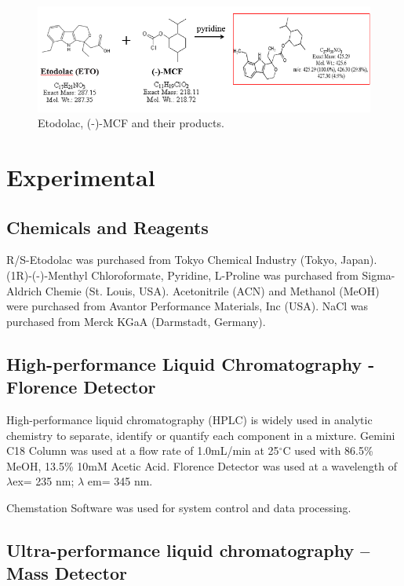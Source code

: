 \documentclass[12pt]{article} %
\begin{document}
\begin{figure}[h]
  \includegraphics[width=\linewidth]{fig1.png}
  \caption{Etodolac, (-)-MCF and their products.}
  \label{fig:fig1}
\end{figure}

\newpage




\section{Experimental}

\subsection{Chemicals and Reagents}
  R/S-Etodolac was purchased from Tokyo Chemical Industry (Tokyo, Japan).
  (1R)-(-)-Menthyl Chloroformate, Pyridine, L-Proline was purchased from Sigma-Aldrich Chemie (St. Louis, USA).
  Acetonitrile (ACN) and Methanol (MeOH) were purchased from Avantor Performance Materials, Inc (USA).
NaCl was purchased from Merck KGaA (Darmstadt, Germany).

\subsection{High-performance Liquid Chromatography - Florence Detector}
  High-performance liquid chromatography (HPLC) is widely used in analytic chemistry to separate, identify or quantify each component in a mixture. Gemini C18 Column was used at a flow rate of 1.0mL/min at 25$^{\circ}$C  used with 86.5\% MeOH, 13.5\% 10mM Acetic Acid.
  Florence Detector was used at a wavelength of $\lambda$ex= 235 nm; $\lambda$ em= 345 nm.

  Chemstation Software was used for system control and data processing.


\subsection{Ultra-performance liquid chromatography – Mass Detector}
\end{document}
